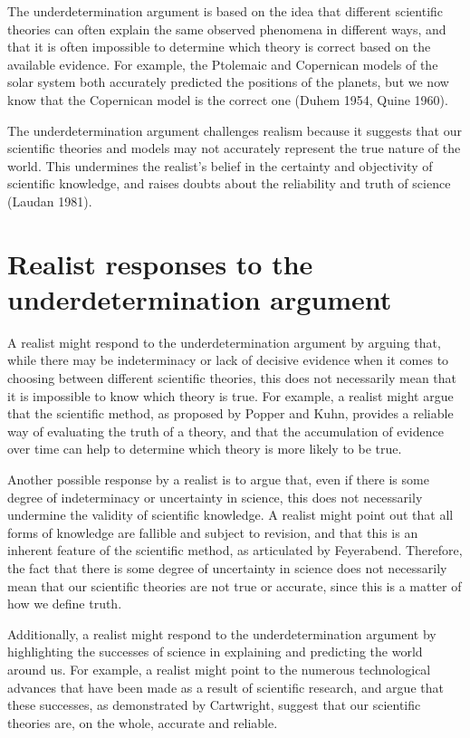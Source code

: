 \documentclass[12pt]{article}
\begin{document}
	The underdetermination argument is based on the idea that different scientific theories can often explain the same observed phenomena in different ways, and that it is often impossible to determine which theory is correct based on the available evidence. For example, the Ptolemaic and Copernican models of the solar system both accurately predicted the positions of the planets, but we now know that the Copernican model is the correct one (Duhem 1954, Quine 1960).

	The underdetermination argument challenges realism because it suggests that our scientific theories and models may not accurately represent the true nature of the world. This undermines the realist's belief in the certainty and objectivity of scientific knowledge, and raises doubts about the reliability and truth of science (Laudan 1981).

	\section*{Realist responses to the underdetermination argument}
	A realist might respond to the underdetermination argument by arguing that, while there may be indeterminacy or lack of decisive evidence when it comes to choosing between different scientific theories, this does not necessarily mean that it is impossible to know which theory is true. For example, a realist might argue that the scientific method, as proposed by Popper and Kuhn, provides a reliable way of evaluating the truth of a theory, and that the accumulation of evidence over time can help to determine which theory is more likely to be true.

	Another possible response by a realist is to argue that, even if there is some degree of indeterminacy or uncertainty in science, this does not necessarily undermine the validity of scientific knowledge. A realist might point out that all forms of knowledge are fallible and subject to revision, and that this is an inherent feature of the scientific method, as articulated by Feyerabend. Therefore, the fact that there is some degree of uncertainty in science does not necessarily mean that our scientific theories are not true or accurate, since this is a matter of how we define truth.

	Additionally, a realist might respond to the underdetermination argument by highlighting the successes of science in explaining and predicting the world around us. For example, a realist might point to the numerous technological advances that have been made as a result of scientific research, and argue that these successes, as demonstrated by Cartwright, suggest that our scientific theories are, on the whole, accurate and reliable.
\end{document}

